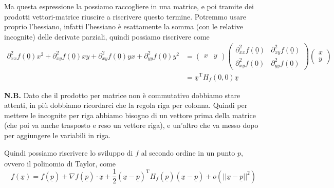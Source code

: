 \documentclass{rapport}
\begin{document}
\newpage

Ma questa espressione la possiamo raccogliere in una matrice, e poi tramite dei prodotti vettori-matrice riuscire a riscrivere questo termine. Potremmo usare proprio l'hessiano, infatti l'hessiano è esattamente la somma (con le relative incognite) delle derivate parziali, quindi possiamo riscrivere come 
\begin{align*}
\partial^2_{xx} f(\underline{0})x^2+ \partial^2_{xy} f(\underline{0})xy+\partial^2_{xy} f(\underline{0})yx+ \partial^2_{yy} f(\underline{0})y^2  &= \begin{pmatrix}
  x & y
\end{pmatrix} \begin{pmatrix}
 \partial^2_{xx} f(\underline{0}) & \partial^2_{xy} f(\underline{0}) \\
 \partial^2_{xy} f(\underline{0}) & \partial^2_{yy} f(\underline{0})
\end{pmatrix}\begin{pmatrix}
  x \\
  y
\end{pmatrix} \\
&= \underline{x}^{\text{T}} H_f(0,0) \underline{x}
\end{align*}

\textbf{N.B.} Dato che il prodotto per matrice non è commutativo dobbiamo stare attenti, in più dobbiamo ricordarci che la regola riga per colonna. Quindi per mettere le incognite per riga abbiamo bisogno di un vettore prima della matrice (che poi va anche trasposto e reso un vettore riga), e un'altro che va messo dopo per aggiungere le variabili in riga.

Quindi possiamo riscrivere lo sviluppo di $f$ al secondo ordine in un punto $\underline{p}$, ovvero il polinomio di Taylor, come 
\[
f(\underline{x}) = f(\underline{p}) + \nabla f(\underline{p}) \cdot \underline{x}  + \dfrac{1}{2} (\underline{x}-\underline{p})^{\text{T}} H_f(\underline{p})(\underline{x}-\underline{p}) + o(||\underline{x}-\underline{p}||^2)
\]
\end{document}
